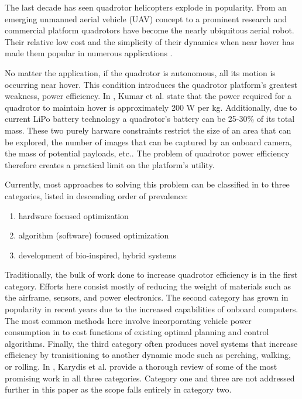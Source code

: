  
The last decade has seen quadrotor helicopters explode in popularity. From an emerging unmanned aerial vehicle (UAV) concept to a prominent research and commercial platform \cite{kumar2012opportunities,hoffmann2007quadrotor} quadrotors have become the nearly ubiquitous aerial robot. Their relative low cost and the simplicity of their dynamics when near hover \cite{bouabdallah2004pid} has made them popular in numerous applications \cite{heng2015efficient,roberts2017submodular,frazzoli2002real}. 

No matter the application, if the quadrotor is autonomous, all its motion is occurring near hover. This condition introduces the quadrotor platform's greatest weakness, power efficiency. In \cite{kumar2012opportunities}, Kumar et al. state that the power required for a quadrotor to maintain hover is approximately 200 W per kg. Additionally, due to current LiPo battery technology a quadrotor's battery can be 25-30\% of its total mass. These two purely harware constraints restrict the size of an area that can be explored, the number of images that can be captured by an onboard camera, the mass of potential payloads, etc.. The problem of quadrotor power efficiency therefore creates a practical limit on the platform's utility. 

Currently, most approaches to solving this problem can be classified in to three categories, listed in descending order of prevalence: 
\begin{enumerate}
	\item hardware focused optimization
	\item algorithm (software) focused optimization
	\item development of bio-inspired, hybrid systems
\end{enumerate}
Traditionally, the bulk of work done to increase quadrotor efficiency is in the first category. Efforts here consist mostly of reducing the weight of materials such as the airframe, sensors, and power electronics. The second category has grown in popularity in recent years due to the increased capabilities of onboard computers. The most common methods here involve incorporating vehicle power consumption in to cost functions of existing optimal planning and control algorithms. Finally, the third category often produces novel systems that increase efficiency by tranisitioning to another dynamic mode such as perching, walking, or rolling. In \cite{karydis2017energetics}, Karydis et al. provide a thorough review of some of the most promising work in all three categories. Category one and three are not addressed further in this paper as the scope falls entirely in category two.

